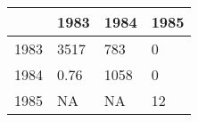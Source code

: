 \begin{table}[ht]
\centering
\begin{tabular}{rlll}
  \hline
 & 1983 & 1984 & 1985 \\ 
  \hline
1983 & 3517 & 783 & 0 \\ 
  1984 &  0.76 & 1058 & 0 \\ 
  1985 &    NA &    NA & 12 \\ 
   \hline
\end{tabular}
\end{table}
